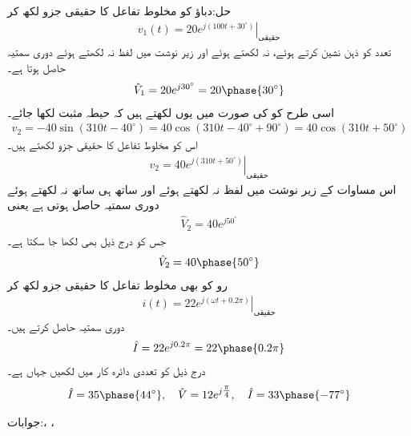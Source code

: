 حل:دباؤ  کو مخلوط تفاعل کا حقیقی جزو لکھ کر
\begin{align*}
v_1(t)=\left. 20 e^{j(100 t+30^{\circ})}\right|_{\text{حقیقی}}
\end{align*}
تعدد کو ذہن نشین کرتے ہوئے،   نہ لکھتے  ہوئے اور زیر نوشت میں لفظ  نہ لکھتے ہوئے  دوری سمتیہ حاصل ہوتا ہے۔
\begin{align*}
\hat{V}_1=20 e^{j30^{\circ}}=20\phase{30^{\circ}}
\end{align*}
اسی طرح  کو  کی صورت میں یوں لکھتے ہیں کہ حیطہ مثبت لکھا جائے۔
\begin{align*}
v_2=-40 \sin(310t-40^{\circ})=40 \cos (310 t-40^{\circ}+90^{\circ})=40 \cos (310t+50^{\circ})
\end{align*} 
اس کو مخلوط تفاعل کا حقیقی جزو لکھتے ہیں۔
\begin{align*}
v_2=\left.40 e^{j(310t+50^{\circ})}\right|_{\text{حقیقی}}
\end{align*} 
اس مساوات کے زیر نوشت میں لفظ  نہ لکھتے ہوئے اور ساتھ ہی ساتھ  نہ لکھتے ہوئے دوری سمتیہ حاصل ہوتی ہے یعنی
\begin{align*}
\hat{V}_2=40 e^{ j50^{\circ}}
\end{align*} 
جس کو درج ذیل بھی لکھا جا سکتا ہے۔
\begin{align*}
\hat{V}_2=40 \phase{50^{\circ}}
\end{align*} 
رو کو بھی مخلوط تفاعل کا حقیقی جزو لکھ کر
\begin{align*}
i(t)=\left. 22 e^{j(\omega t+0.2\pi)} \right|_{\text{حقیقی}}
\end{align*}
دوری سمتیہ حاصل کرتے ہیں۔
\begin{align*}
\hat{I}=22 e^{j 0.2\pi}=22\phase{0.2 \pi}
\end{align*}
درج ذیل کو تعددی دائرہ کار میں لکھیں جہاں  ہے۔
\begin{align*}
\hat{I}=35\phase{44^{\circ}}, \quad \hat{V}=12 e^{j\tfrac{\pi}{4}}, \quad \hat{I}=33\phase{-77^{\circ}}
\end{align*}

جوابات:، ،\\

